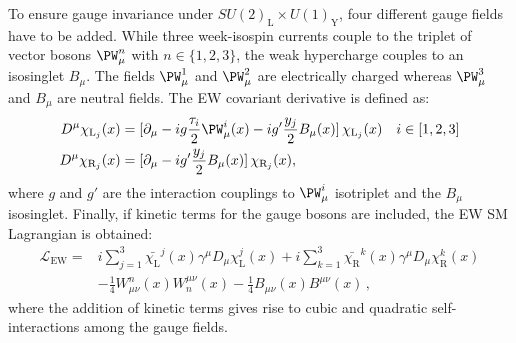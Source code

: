 
To ensure gauge invariance under  $SU(2)_{\text{L}} \times U(1)_{\text{Y}}$, four different gauge 
fields have to be added. %
While three week-isospin currents couple to the triplet of vector bosons $\PW^{n}_{\mu}$ 
with $n \in \{1,2,3 \}$, the weak hypercharge couples to an isosinglet $B_\mu$.
The fields $\PW^{1}_{\mu}$ and $\PW^{2}_{\mu}$ are electrically charged 
whereas $\PW^{3}_{\mu}$ and $B_\mu$ are neutral fields. 
The EW covariant derivative is defined as:
\begin{align}
	D^{\mu} \chi_{\text{L}_{j}}(x)	& =  [\partial_{\mu} - i g \frac{\tau_{i}}{2}\PW^{i}_{\mu}(x)  - i g' \frac{y_j}{2}  B_{\mu}(x) ] \, \chi_{\text{L}_{j}} (x)  &&  i \in [1,2,3] 	\label{eq:chap1:EW:CovariantDerivatice1} \\
	D^{\mu} \chi_{\text{R}_{j}}(x)	& = [\partial_{\mu} - i g' \frac{y_j}{2}  B_{\mu}(x)] \,\chi_{\text{R}_{j}}(x)		,										\label{eq:chap1:EW:CovariantDerivatice2}
\end{align}
where $g$ and $g'$ are the interaction couplings to $\PW^{i}_\mu$ isotriplet and the $B_{\mu}$ isosinglet.
Finally, if kinetic terms for the gauge bosons are included, the EW SM Lagrangian is obtained:
\begin{equation}
\begin{split}\label{eq:chap1:EW:FinalL}
	\mathcal{L}_{\text{EW}}  =	& i \sum_{j=1}^{3} \bar{\chi_\text{L}}^{j}(x) \gamma^{\mu} D_{\mu} \chi_\text{L}^{j}(x)+  i \sum_{k=1}^{3} \bar{\chi_\text{R}}^{k}(x) \gamma^{\mu} D_{\mu} \chi_\text{R}^{k}(x) \\
					& - \frac{1}{4} W^{n}_{\mu \nu}(x)W_{n}^{\mu \nu}(x) - \frac{1}{4} B_{\mu \nu}(x)B^{\mu \nu}(x) \, ,
\end{split}
\end{equation}
where the addition of kinetic terms gives rise to cubic and quadratic self-interactions among the gauge fields.

